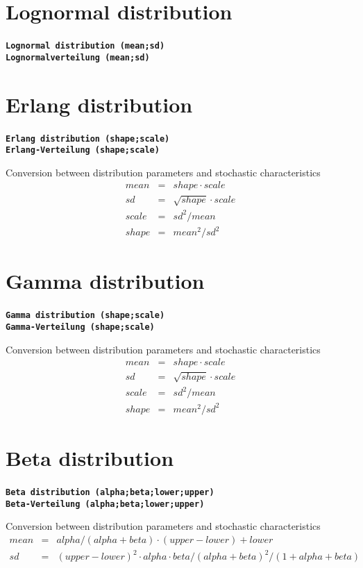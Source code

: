 \documentclass{svmono}
\def\cm#1{\textbf{\texttt{#1}}}
\begin{document}
\section*{Lognormal distribution}
\cm{Lognormal distribution (mean;sd)}~\\
\cm{Lognormalverteilung (mean;sd)}





\section*{Erlang distribution}
\cm{Erlang distribution (shape;scale)}~\\
\cm{Erlang-Verteilung (shape;scale)}

Conversion between distribution parameters and stochastic characteristics
\begin{eqnarray*}
mean&=&shape\cdot scale\\
sd&=&\sqrt{shape}\cdot scale\\
scale&=&sd^2/mean\\
shape&=&mean^2/sd^2
\end{eqnarray*}





\section*{Gamma distribution}
\cm{Gamma distribution (shape;scale)}~\\
\cm{Gamma-Verteilung (shape;scale)}

Conversion between distribution parameters and stochastic characteristics
\begin{eqnarray*}
mean&=&shape\cdot scale\\
sd&=&\sqrt{shape}\cdot scale\\
scale&=&sd^2/mean\\
shape&=&mean^2/sd^2
\end{eqnarray*}





\section*{Beta distribution}
\cm{Beta distribution (alpha;beta;lower;upper)}~\\
\cm{Beta-Verteilung (alpha;beta;lower;upper)}

Conversion between distribution parameters and stochastic characteristics
\begin{eqnarray*}
mean&=&alpha/(alpha+beta)\cdot(upper-lower)+lower\\
sd&=&(upper-lower)^2\cdot alpha\cdot beta/(alpha+beta)^2/(1+alpha+beta)
\end{eqnarray*}
\end{document}
